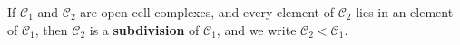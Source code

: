 If $\mathcal{C}_1$ and $\mathcal{C}_2$ are open cell-complexes, and every element of $\mathcal{C}_2$ lies in an element of $\mathcal{C}_1$, then $\mathcal{C}_2$ is a \textbf{subdivision} of $\mathcal{C}_1$, and we write $\mathcal{C}_2 < \mathcal{C}_1$.
